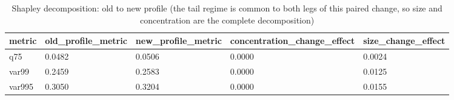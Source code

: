 \begin{table}[htbp]
\centering
\caption{Shapley decomposition: old to new profile (the tail regime is common to both legs of this paired change, so size and concentration are the complete decomposition)}
\label{tab:v2_decomp}
\begin{tabular}{lllll}
\toprule
\textbf{metric} & \textbf{old_profile_metric} & \textbf{new_profile_metric} & \textbf{concentration_change_effect} & \textbf{size_change_effect} \\
\midrule
q75 & 0.0482 & 0.0506 & 0.0000 & 0.0024 \\
var99 & 0.2459 & 0.2583 & 0.0000 & 0.0125 \\
var995 & 0.3050 & 0.3204 & 0.0000 & 0.0155 \\
\bottomrule
\end{tabular}
\end{table}
